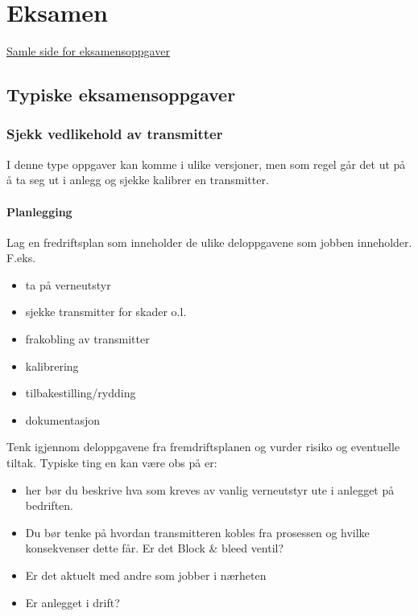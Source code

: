 
\chapter{Eksamen}
\href{https://sokeresultat.udir.no/eksamensoppgaver.html?query=AUT4002}{Samle side for eksamensoppgaver}


\section{Typiske eksamensoppgaver}

\subsection{Sjekk vedlikehold av transmitter}

I denne type oppgaver kan komme i ulike versjoner, men som regel går det ut på å ta seg ut i anlegg og sjekke kalibrer en transmitter. 
\subsubsection*{Planlegging}
Lag en fredriftsplan som inneholder de ulike deloppgavene  som jobben inneholder. 
F.eks. 
\begin{itemize}
	\item ta på verneutstyr
	\item sjekke transmitter for skader o.l. 
	\item frakobling av transmitter
	\item kalibrering
	\item tilbakestilling/rydding
	\item dokumentasjon
\end{itemize}


Tenk igjennom deloppgavene fra fremdriftsplanen og vurder risiko og eventuelle tiltak. Typiske ting en kan være obs på er:
\begin{itemize}
	\item her bør du beskrive hva som kreves av vanlig verneutstyr ute i anlegget på bedriften.
	\item Du bør tenke på hvordan transmitteren kobles fra prosessen og hvilke konsekvenser dette får. Er det Block \& bleed ventil? 
	\item Er det aktuelt med andre som jobber i nærheten
	\item Er anlegget i drift?
\end{itemize}

